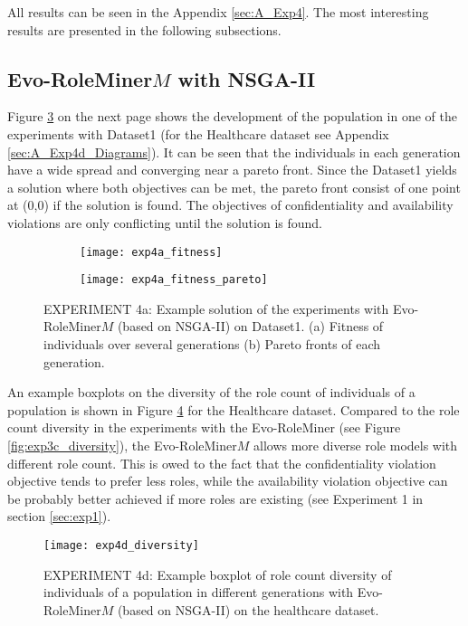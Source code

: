 All results can be seen in the Appendix \ref{sec:A_Exp4}. The most interesting results are presented in the following subsections.

\subsection{Evo-RoleMiner$M$ with NSGA-II}
Figure \ref{fig:exp4a_fitness} on the next page shows the development of the population in one of the experiments with Dataset1 (for the Healthcare dataset see Appendix \ref{sec:A_Exp4d_Diagrams}). It can be seen that the individuals in each generation have a wide spread and converging near a pareto front. Since the Dataset1 yields a solution where both objectives can be met, the pareto front consist of one point at (0,0) if the solution is found. The objectives of confidentiality and availability violations are only conflicting until the solution is found.

\begin{figure}[H]
	\centering
	\begin{subfigure}{\textwidth}
		\centering
		\texttt{[image: exp4a\_fitness]}
		\caption{}
		\label{fig:exp4a_fitness_A}
	\end{subfigure}
	\begin{subfigure}{\textwidth}
		\centering
		\texttt{[image: exp4a\_fitness\_pareto]}
		\caption{}
		\label{fig:exp4a_fitness_B}
	\end{subfigure}
	\caption{EXPERIMENT 4a: Example solution of the experiments with Evo-RoleMiner$M$ (based on NSGA-II) on Dataset1. (a) Fitness of individuals over several generations (b) Pareto fronts of each generation.}
	\label{fig:exp4a_fitness}
\end{figure}

An example boxplots on the diversity of the role count of individuals of a population is shown in Figure \ref{fig:exp4d_diversity} for the Healthcare dataset. Compared to the role count diversity in the experiments with the Evo-RoleMiner (see Figure \ref{fig:exp3c_diversity}), the Evo-RoleMiner$M$ allows more diverse role models with different role count. This is owed to the fact that the confidentiality violation objective tends to prefer less roles, while the availability violation objective can be probably better achieved if more roles are existing (see Experiment 1 in section \ref{sec:exp1}).

\begin{figure}[H]
	\centering
	\texttt{[image: exp4d\_diversity]}
	\caption{EXPERIMENT 4d: Example boxplot of role count diversity of individuals of a population in different generations with Evo-RoleMiner$M$ (based on NSGA-II) on the healthcare dataset.}
	\label{fig:exp4d_diversity}
\end{figure}

